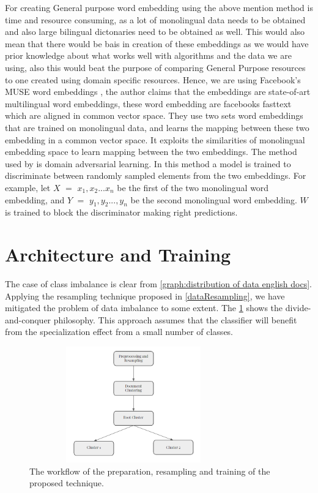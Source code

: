 For creating General purpose word embedding using the above mention method is time and resource consuming, as a lot of monolingual data needs to be obtained and also large bilingual dictonaries need to be obtained as well. This would also mean that there would be bais in creation of these embeddings as we would have prior knowledge about what works well with algorithms and the data we are using, also this would beat the purpose of comparing General Purpose resources to one created using domain specific resources. Hence, we are using Facebook's MUSE word embeddings \cite{conneau2017word}, the author claims that the embeddings are state-of-art multilingual word embeddings, these word embedding are facebooks fasttext \cite{bojanowski2017enriching} which are aligned in common vector space. They use two sets word embeddings that are trained on monolingual data, and learns the mapping between these two embedding in a common vector space. It exploits the similarities of monolingual embedding space \cite{mikolov2013exploiting} to learn mapping between the two embeddings.
The method used by \cite{conneau2017word} is domain adversarial learning.  In this method a model is trained to discriminate between randomly sampled elements from the two embeddings. For example, let $X$ $=$ ${x_{1}, x_{2}...x_{n}}$ be the first of the two monolingual word embedding, and $Y$ $=$ ${y_{1}, y_{2}...,y_{n}}$ be the second monolingual word embedding. $W$ is trained to block the discriminator making right predictions. 


\section{Architecture and Training}

The case of class imbalance is clear from \ref{graph:distribution of data english docs}. Applying the resampling technique proposed in \ref{dataResampling}, we have mitigated the problem of data imbalance to some extent. The \ref{fig:approach} shows the divide-and-conquer philosophy. This approach assumes that the classifier will benefit from the specialization effect from a small number of classes. \\

\begin{figure}[!ht]
    \centering
    \includegraphics[height=5cm,width=9cm,keepaspectratio]{pics/Approach.PNG}
    \captionsetup{justification=centering,margin=2cm}
    \caption{The workflow of the preparation, resampling and training of the proposed technique.}
    \label{fig:approach}
\end{figure}
\clearpage

